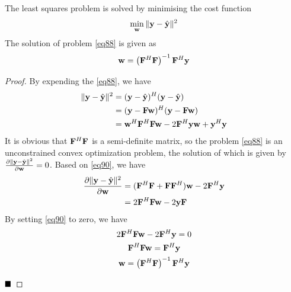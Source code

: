 \documentclass[10pt]{article}
\newtheorem*{proof}{Proof}[section]
\begin{document}
The least squares problem is solved by minimising the cost function
\begin{equation}
	\min_{\bf{w}} \Vert {\bf{y}} - \hat{\bf{y}} \Vert^2 \label{eq88}
\end{equation}
The solution of problem \eqref{eq88} is given as
\begin{equation}
	{\bf{w}} = \left( {\bf{F}}^H{\bf{F}} \right)^{-1} {\bf{F}}^H {\bf{y}} \label{eq89}
\end{equation}

\begin{proof}
	By expending the \eqref{eq88}, we have
	\begin{align}
		\Vert {\bf{y}} - \hat{\bf{y}} \Vert^2 & = ( {\bf{y}} - \hat{\bf{y}} )^H( {\bf{y}} - \hat{\bf{y}} ) \nonumber \\
		& = ( {\bf{y}} - {\bf{F}} {\bf{w}} )^H( {\bf{y}} - {\bf{F}} {\bf{w}} ) \nonumber \\
		& = {\bf{w}}^H {\bf{F}}^H {\bf{F}} {\bf{w}} - 2 {\bf{F}}^H {\bf{y}} {\bf{w}} + {\bf{y}}^H {\bf{y}} \label{eq90}
	\end{align}
	It is obvious that ${\bf{F}}^H {\bf{F}}$ is a semi-definite matrix, so the problem \eqref{eq88} is 
	an unconstrained convex optimization problem, the solution of which is given by 
	$\frac{\partial{ \Vert {\bf{y}} - \hat{\bf{y}} \Vert^2 }}{ \partial{\bf{w}}} = 0$.
	Based on \eqref{eq90}, we have
	\begin{align}
		\frac{\partial{ \Vert {\bf{y}} - \hat{\bf{y}} \Vert^2 }}{ \partial{\bf{w}}} & = ({\bf{F}}^H {\bf{F}} + {\bf{F}} {\bf{F}}^H) {\bf{w}} - 2{\bf{F}}^H {\bf{y}} \nonumber\\
		& = 2{\bf{F}}^H {\bf{F}} {\bf{w}} - 2{\bf{y}}{\bf{F}} \label{eq90}
	\end{align}
	By setting \eqref{eq90} to zero, we have
	\begin{gather}
		2{\bf{F}}^H {\bf{F}} {\bf{w}} - 2{\bf{F}}^H{\bf{y}} = 0 \\
		{\bf{F}}^H {\bf{F}} {\bf{w}} = {\bf{F}}^H{\bf{y}} \\
		{\bf{w}} = \left( {\bf{F}}^H{\bf{F}} \right)^{-1} {\bf{F}}^H {\bf{y}}
	\end{gather}

	$\hfill\blacksquare$ 
\end{proof}
\end{document}
